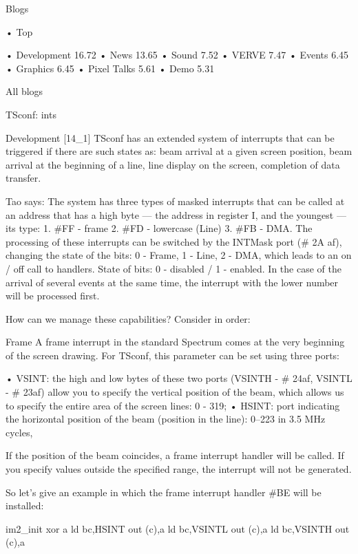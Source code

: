 Blogs

  • Top

  • Development 16.72
  • News 13.65
  • Sound 7.52
  • VERVE 7.47
  • Events 6.45
  • Graphics 6.45
  • Pixel Talks 5.61
  • Demo 5.31

All blogs

TSconf: ints

Development  
[14_1]
TSconf has an extended system of interrupts that can be triggered if there are
such states as: beam arrival at a given screen position, beam arrival at the
beginning of a line, line display on the screen, completion of data transfer.


    Tao says: The system has three types of masked interrupts that can be
    called at an address that has a high byte — the address in register I, and
    the youngest — its type:
     1. #FF - frame
     2. #FD - lowercase (Line)
     3. #FB - DMA.
    The processing of these interrupts can be switched by the INTMask port (#
    2A af), changing the state of the bits:
    0 - Frame, 1 - Line, 2 - DMA, which leads to an on / off call to handlers.
    State of bits: 0 - disabled / 1 - enabled.
    In the case of the arrival of several events at the same time, the
    interrupt with the lower number will be processed first.



How can we manage these capabilities? Consider in order:

Frame A
frame interrupt in the standard Spectrum comes at the very beginning of the
screen drawing. For TSconf, this parameter can be set using three ports:

  • VSINT: the high and low bytes of these two ports (VSINTH - # 24af, VSINTL -
    # 23af) allow you to specify the vertical position of the beam, which
    allows us to specify the entire area of ​​the screen lines: 0 - 319;
  • HSINT: port indicating the horizontal position of the beam (position in the
    line): 0–223 in 3.5 MHz cycles,

If the position of the beam coincides, a frame interrupt handler will be
called. If you specify values ​​outside the specified range, the interrupt will
not be generated.

So let's give an example in which the frame interrupt handler #BE will be
installed:

im2_init
                xor a
                ld bc,HSINT
                out (c),a
                ld bc,VSINTL
                out (c),a
                ld bc,VSINTH
                out (c),a

